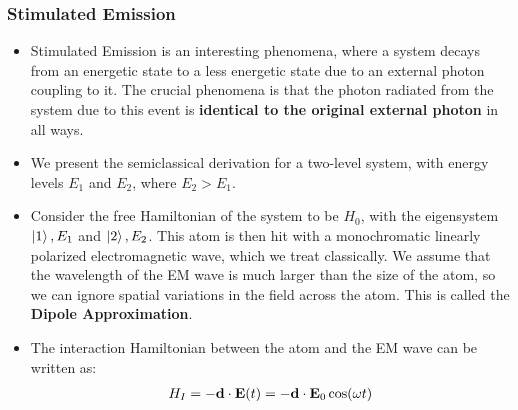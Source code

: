 \documentclass{beamer}
\begin{document}
\begin{frame}
    \frametitle{Stimulated Emission}
    \begin{itemize}
        \item Stimulated Emission is an interesting phenomena, where a system decays from an energetic state to a less energetic state due to an external photon coupling to it. The crucial phenomena is that the photon radiated from the system due to this event is \textbf{identical to the original external photon} in all ways. \pause
        
        \item We present the semiclassical derivation for a two-level system, with energy levels $E_{1}$ and $E_{2}$, where $E_{2} > E_{1}$. 
        
        \item Consider the free Hamiltonian of the system to be $H_{0}$, with the eigensystem ${\ket{1}, E_{1}}$ and ${\ket{2}, E_{2}}$. This atom is then hit with a monochromatic linearly polarized electromagnetic wave, which we treat classically. We assume that the wavelength of the EM wave is much larger than the size of the atom, so we can ignore spatial variations in the field across the atom. This is called the \textbf{Dipole Approximation}. \pause
        
        \item The interaction Hamiltonian between the atom and the EM wave can be written as:
        \begin{align*}
            H_{I} = -\vb{d} \cdot \vb{E}(t) = -\vb{d} \cdot \vb{E}_{0} \cos(\omega t)
        \end{align*}
        
    \end{itemize}

    \end{frame}
\end{document}
